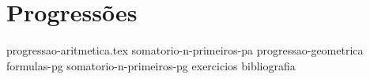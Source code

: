 \chapter{Progressões}
{
    \newcommand{\chapterdir}{../capitulos/progressoes/}

    {progressao-aritmetica.tex}
    {somatorio-n-primeiros-pa}
    {progressao-geometrica}
    {formulas-pg}
    {somatorio-n-primeiros-pg}
    {exercicios}
    {bibliografia}
}